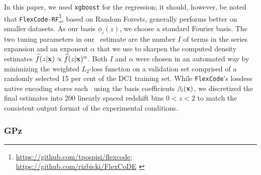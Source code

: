 In this paper, we used \texttt{xgboost} \citep{Chen:16} for the regression; it should, however, be noted that \texttt{FlexCode-RF}\footnote{\url{https://github.com/tpospisi/flexcode};\\ \url{https://github.com/rizbicki/FlexCoDE} \label{flexzboost_github}}, based on Random Forests, generally performs better on smaller datasets.
As our basis $\phi_{i}(z)$, we choose a standard Fourier basis.
The two tuning parameters in our \pzpdf\ estimate are the number $I$ of terms in the series expansion and an exponent $\alpha$ that we use to sharpen the computed density estimates $\widetilde{f}(z \vert {\mathbf{x}}) \propto \widehat{f}(z \vert {\mathbf{x}})^{\alpha}$.
Both $I$ and $\alpha$ were chosen in an automated way by minimizing the weighted $L_2$-loss function \citep[Eq. 5 in][]{Izbicki:17} on a validation set comprised of a randomly selected 15 per cent of the DC1 training set.
While \texttt{FlexCode}'s lossless native encoding stores each \pzpdf\ using the basis coefficients $\beta_{i}({\mathbf{x}})$, we discretized the final estimates into 200 linearly spaced redshift bins $0 < z < 2$ to match the consistent output format of the experimental conditions.

%
%

\subsubsection{GPz}
\label{sec:gpz}

